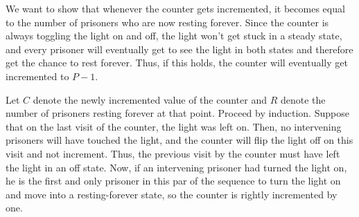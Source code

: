 \documentclass{article}
\begin{document}
We want to show that whenever the counter gets incremented, it becomes equal to the number of prisoners who are now resting forever. Since the counter is always toggling the light on and off, the light won't get stuck in a steady state, and every prisoner will eventually get to see the light in both states and therefore get the chance to rest forever. Thus, if this holds, the counter will eventually get incremented to $P-1$. 

Let $C$ denote the newly incremented value of the counter and $R$ denote the number of prisoners resting forever at that point. Proceed by induction. Suppose that on the last visit of the counter, the light was left on. Then, no intervening prisoners will have touched the light, and the counter will flip the light off on this visit and not increment. Thus, the previous visit by the counter must have left the light in an off state. Now, if an intervening prisoner had turned the light on, he is the first and only prisoner in this par of the sequence to turn the light on and move into a resting-forever state, so the counter is rightly incremented by one.
\end{document}
